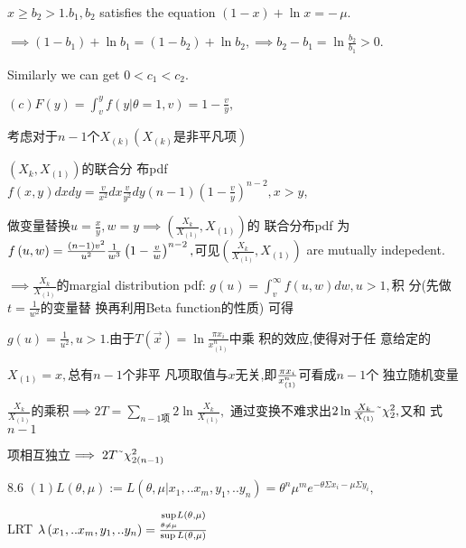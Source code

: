 \documentclass{article}
\begin{document}
$x\geq b_{2}>1.b_{1},b_{2}$ satisfies the equation $\left( 1-x\right) +\ln
x=-\,\mu .$

$\implies \left( 1-b_{1}\right) +\ln b_{1}=\left( 1-b_{2}\right) +\ln
b_{2},\implies b_{2}-b_{1}=\ln \frac{b_{2}}{b_{1}}>0.$

Similarly we can get $0<c_{1}<c_{2}.$

$\left( c\right) F\left( y\right) =\int_{v}^{y}f\left( y|\theta =1,v\right)
=1-\frac{v}{y},$

考虑对于$n-1$个$X_{\left( k\right) }\left(
X_{\left( k\right) }\text{是非平凡项}\right) $

$\left( X_{k},X_{\left( 1\right) }\right) $的联合分%
布pdf $f\left( x,y\right) dxdy=\frac{v}{x^{2}}dx\frac{v}{y^{2}}%
dy\left( n-1\right) \left( 1-\frac{v}{y}\right) ^{n-2},x>y$,

做变量替换$u=\frac{x}{y},w=y\implies \left( 
\frac{X_{k}}{X_{\left( 1\right) }},X_{\left( 1\right) }\right) $的%
联合分布pdf 为$f\left( u,w\right) =\frac{%
\left( n-1\right) v^{2}}{u^{2}}\frac{1}{w^{3}}\left( 1-\frac{v}{w}\right)
^{n-2},$可见$\left( \frac{X_{k}}{X_{\left( 1\right) }},X_{\left(
1\right) }\right) $ are mutually indepedent.

$\implies \frac{X_{k}}{X_{\left( 1\right) }}$的margial distribution
pdf: $g\left( u\right) =\int_{v}^{\infty }f\left( u,w\right) dw,u>1,$积%
分(先做$t=\frac{1}{w^{2}}$的变量替%
换再利用Beta function的性质)%
可得

$g\left( u\right) =\frac{1}{u^{2}},u>1.$由于$T\left( \vec{x}%
\right) =\ln \frac{\pi x_{i}}{x_{\left( 1\right) }^{n}}$中乘%
积的效应,使得对于任%
意给定的

$X_{\left( 1\right) }=x,$总有$n-1$个非平%
凡项取值与$x$无关,即$\frac{%
\pi x_{i}}{x_{\left( 1\right) }^{n}}$可看成$n-1$个%
独立随机变量

$\frac{X_{k}}{X_{\left( 1\right) }}$的乘积$\implies 2T=%
\underset{n-1项 }{\sum }2\ln \frac{X_{k}}{X_{\left( 1\right) }},$%
通过变换不难求出$2\ln \frac{%
X_{k}}{X_{\left( 1\right) }}\symbol{126}\chi _{2}^{2},$又和%
式$n-1$

项相互独立$\implies 2T\symbol{126}\chi
_{2\left( n-1\right) }^{2}$

8.6 $\left( 1\right) L\left( \theta ,\mu \right) :=L\left( \theta ,\mu
|x_{1},..x_{m},y_{1},..y_{n}\right) =\theta ^{n}\mu ^{m}e^{-\theta \Sigma
x_{i}-\mu \Sigma y_{i}},$

\bigskip LRT $\lambda \left( x_{1},..x_{m},y_{1},..y_{n}\right) =\frac{%
\underset{\theta \neq \mu }{\sup }L\left( \theta ,\mu \right) }{\sup L\left(
\theta ,\mu \right) }$
\end{document}
